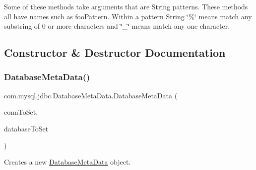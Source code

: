 Some of these methods take arguments that are String patterns. These methods all have names such as foo\+Pattern. Within a pattern String \char`\"{}\%\char`\"{} means match any substring of 0 or more characters and \char`\"{}\+\_\+\char`\"{} means match any one character. 

\subsection{Constructor \& Destructor Documentation}
\mbox{\label{classcom_1_1mysql_1_1jdbc_1_1_database_meta_data_a754255faffa1310c4d9507733583ae72}} 
\subsubsection{\texorpdfstring{Database\+Meta\+Data()}{DatabaseMetaData()}}
{\footnotesize\ttfamily com.\+mysql.\+jdbc.\+Database\+Meta\+Data.\+Database\+Meta\+Data (\begin{DoxyParamCaption}\item[{\mbox{\hyperlink{interfacecom_1_1mysql_1_1jdbc_1_1_my_s_q_l_connection}{My\+S\+Q\+L\+Connection}}}]{conn\+To\+Set,  }\item[{String}]{database\+To\+Set }\end{DoxyParamCaption})\hspace{0.3cm}{\ttfamily [protected]}}

Creates a new \mbox{\hyperlink{classcom_1_1mysql_1_1jdbc_1_1_database_meta_data}{Database\+Meta\+Data}} object.


